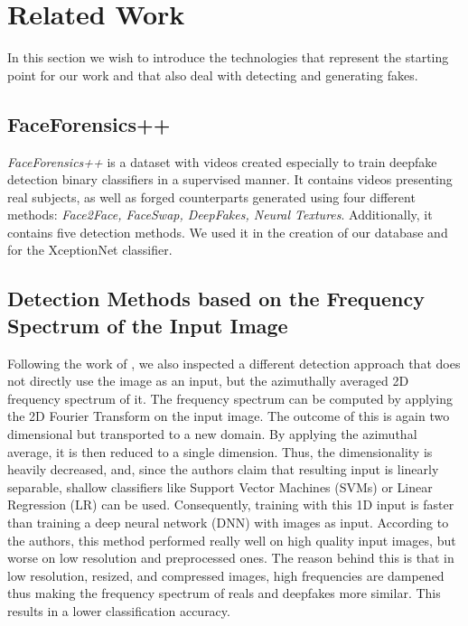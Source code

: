 \documentclass[11pt]{article}
\begin{document}
\section{Related Work}

In this section we wish to introduce the technologies that represent the starting point for our work and that also deal with detecting and generating fakes.

\subsection*{FaceForensics++}
\textit{FaceForensics++} \cite{roessler2019faceforensics++} is a dataset with videos created especially to train deepfake detection binary classifiers in a supervised manner. It contains videos presenting real subjects, as well as forged counterparts generated using four different methods: \emph{Face2Face, FaceSwap, DeepFakes, Neural Textures}. Additionally, it contains five detection methods. We used it in the creation of our database and for the XceptionNet classifier.


\subsection*{Detection Methods based on the Frequency Spectrum of the Input Image}
Following the work of \cite{durall2020unmasking}, we also inspected a different detection approach that does not directly use the image as an input, but the azimuthally averaged 2D frequency spectrum of it. The frequency spectrum can be computed by applying the 2D Fourier Transform on the input image. The outcome of this is again two dimensional but transported to a new domain. By applying the azimuthal average, it is then reduced to a single dimension. Thus, the dimensionality is heavily decreased, and, since the authors claim that resulting input is linearly separable, shallow classifiers like Support Vector Machines (SVMs) or Linear Regression (LR) can be used. Consequently, training with this 1D input is faster than training a deep neural network (DNN) with images as input. According to the authors, this method performed really well on high quality input images, but worse on low resolution and preprocessed ones. The reason behind this is that in low resolution, resized, and compressed images, high frequencies are dampened thus making the frequency spectrum of reals and deepfakes more similar. This results in a lower classification accuracy. 
\end{document}
